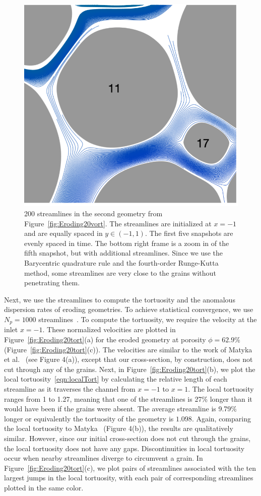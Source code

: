 \documentclass[preprint,10pt]{elsarticle}
\begin{document}
\begin{figure}[H]
\begin{center}
\includegraphics[width = 0.32 \textwidth]{./figs/tracer_20b270n_zoom}
\caption{\label{fig:Eroding20tracer} 200 streamlines in the second
geometry from Figure~\ref{fig:Eroding20vort}. The streamlines are
initialized at $x=-1$ and are equally spaced in $y \in (-1,1)$. The
first five snapshots are evenly spaced in time.  The bottom right frame
is a zoom in of the fifth snapshot, but with additional streamlines.
Since we use the Barycentric quadrature rule and the fourth-order
Runge-Kutta method, some streamlines are very close to the grains
without penetrating them.}
\end{center}
\end{figure}

Next, we use the streamlines to compute the tortuosity and the anomalous
dispersion rates of eroding geometries.  To achieve statistical
convergence, we use $N_p = 1000$ streamlines~\cite{bel-sal-rin1992}. To
compute the tortuosity, we require the velocity at the inlet $x=-1$.
These normalized velocities are plotted in
Figure~\ref{fig:Eroding20tort}(a) for the eroded geometry at porosity
$\phi = 62.9\%$ (Figure~\ref{fig:Eroding20tort}(c)).  The velocities are
similar to the work of Matyka et al.~\cite{mat-kha-koz2008} (see Figure
4(a)), except that our cross-section, by construction, does not cut
through any of the grains.  Next, in Figure~\ref{fig:Eroding20tort}(b),
we plot the local tortuosity~\eqref{eqn:localTort} by calculating the
relative length of each streamline as it traverses the channel from
$x=-1$ to $x=1$.  The local tortuosity ranges from 1 to 1.27, meaning
that one of the streamlines is 27\% longer than it would have been if
the grains were absent.  The average streamline is 9.79\% longer or
equivalently the tortuosity of the geometry is $1.098$.  Again,
comparing the local tortuosity to Matyka~\cite{mat-kha-koz2008} (Figure
4(b)), the results are qualitatively similar. However, since our initial
cross-section does not cut through the grains, the local tortuosity does
not have any gaps.  Discontinuities in local tortuosity occur when
nearby streamlines diverge to circumvent a grain.  In
Figure~\ref{fig:Eroding20tort}(c), we plot pairs of streamlines
associated with the ten largest jumps in the local tortuosity, with each
pair of corresponding streamlines plotted in the same color.
\end{document}
